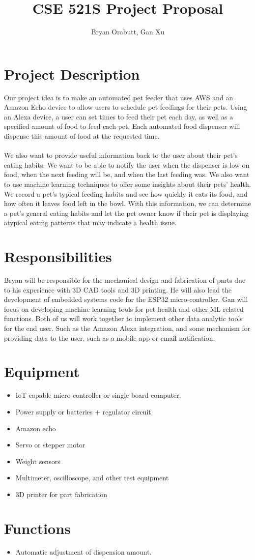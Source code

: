 \documentclass{article}
\title{CSE 521S Project Proposal}
\author{Bryan Orabutt, Gan Xu}
\begin{document}
\maketitle 
\newpage
\section*{Project Description}

Our project idea is to make an automated pet feeder that uses AWS and an Amazon Echo device to allow users to schedule pet feedings for their pets. Using an Alexa device, a user can set times to feed their pet each day, as well as a specified amount of food to feed each pet. Each automated food dispenser will dispense this amount of food at the requested time.\\\\\noindent
We also want to provide useful information back to the user about their pet's eating habits. We want to be able to notify the user when the dispenser is low on food, when the next feeding will be, and when the last feeding was. We also want to use machine learning techniques to offer some insights about their pets' health. We record a pet's typical feeding habits and see how quickly it eats its food, and how often it leaves food left in the bowl. With this information, we can determine a pet's general eating habits and let the pet owner know if their pet is displaying atypical eating patterns that may indicate a health issue.

\section*{Responsibilities}
Bryan will be responsible for the mechanical design and fabrication of parts due to his experience with 3D CAD tools and 3D printing. He will also lead the development of embedded systems code for the ESP32 micro-controller.  Gan will focus on developing machine learning tools for pet health and other ML related functions. Both of us will work together to implement other data analytic tools for the end user. Such as the Amazon Alexa integration, and some mechanism for providing data to the user, such as a mobile app or email notification.

\section*{Equipment}
    \begin{itemize}
        \item IoT capable micro-controller or single board computer.
        \item Power supply or batteries + regulator circuit
        \item Amazon echo
        \item Servo or stepper motor
        \item Weight sensors
        \item Multimeter, oscilloscope, and other test equipment
        \item 3D printer for part fabrication
    \end{itemize}

\section*{Functions}
    \begin{itemize}
        \item Automatic adjustment of dispension amount.
    \end{itemize}
\end{document}
